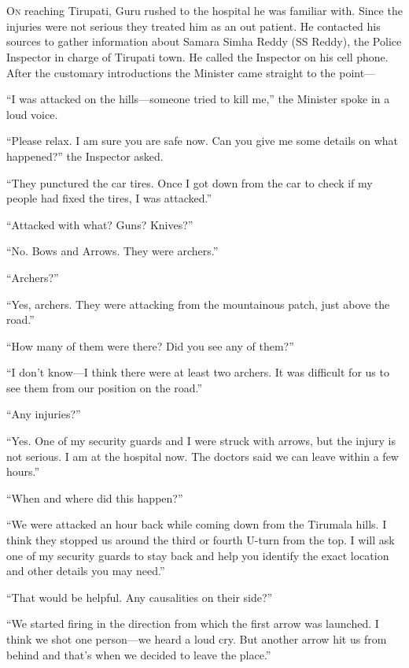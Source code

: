 \chapter{}

\lettrine{O}{n} reaching Tirupati, Guru rushed to the hospital he was familiar with. Since
the injuries were not serious they treated him as an out patient. He contacted
his sources to gather information about Samara Simha Reddy (SS Reddy), the
Police Inspector in charge of Tirupati town. He called the Inspector on his cell
phone. After the customary introductions the Minister came straight to the point—

“I was attacked on the hills—someone tried to kill me,” the Minister spoke in
a loud voice.

“Please relax. I am sure you are safe now. Can you give me some details on what
happened?” the Inspector asked.

“They punctured the car tires. Once I got down from the car to check if my
people had fixed the tires, I was attacked.”

“Attacked with what? Guns? Knives?”

“No. Bows and Arrows. They were archers.”

“Archers?”

“Yes, archers. They were attacking from the mountainous patch, just above the
road.”

“How many of them were there? Did you see any of them?”

“I don't know—I think there were at least two archers. It was difficult for us
to see them from our position on the road.”

“Any injuries?”

“Yes. One of my security guards and I were struck with arrows, but the injury is
not serious. I am at the hospital now. The doctors said we can leave within a
few hours.”

“When and where did this happen?”

“We were attacked an hour back while coming down from the Tirumala hills. I
think they stopped us around the third or fourth U-turn from the top. I will ask
one of my security guards to stay back and help you identify the exact location
and other details you may need.”

“That would be helpful. Any causalities on their side?”

“We started firing in the direction from which the first arrow was launched. I
think we shot one person—we heard a loud cry. But another arrow hit us from
behind and that's when we decided to leave the place.”

